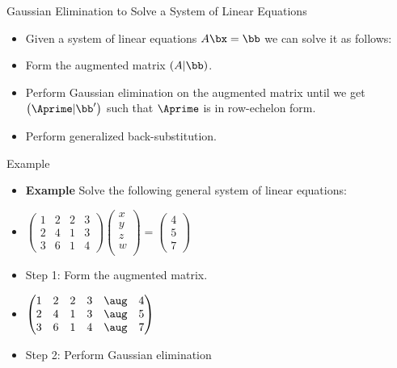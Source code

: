 \documentclass{beamer}
\begin{document}

\begin{frame}{Gaussian Elimination to Solve a System of Linear Equations}

\begin{itemize}
\item Given a system of linear equations $A\bx=\bb$ we can solve it as follows:
\item Form the augmented matrix $\left(A\vert \bb\right)$.
\item Perform Gaussian elimination on the augmented matrix until we get
$\left(\Aprime\vert \bb^{\prime}\right)$ such that $\Aprime$ is in row-echelon form.
\item Perform generalized back-substitution.
\end{itemize}
\end{frame}

\begin{frame}{Example}

\begin{itemize}
\item \textbf{Example} Solve the following general system of linear equations:
\item
$
\begin{pmatrix}
1 & 2 & 2 & 3 \\
2 & 4 & 1 & 3 \\
3 & 6 & 1 & 4
\end{pmatrix}
\begin{pmatrix}
x \\
y \\
z \\
w \\
\end{pmatrix}
=
\begin{pmatrix}
4 \\
5 \\
7
\end{pmatrix}
$
\item Step 1: Form the augmented matrix.
\item
$
\begin{pmatrix}
1 & 2 & 2 & 3  & \aug &  4 \\
2 & 4 & 1 & 3  & \aug &  5 \\
3 & 6 & 1 & 4  & \aug &  7
\end{pmatrix}
$
\item Step 2: Perform Gaussian elimination
\end{itemize}
\end{frame}
\end{document}
